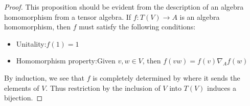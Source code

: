 \documentclass[../thesis.tex]{subfiles}
\begin{document}
            \begin{proof}
                This proposition should be evident from the description of an algebra homomorphism from a tensor algebra. If $f: T(V) \rightarrow A$ is an algebra homomorphism, then $f$ must satisfy the following conditions:
                \begin{itemize}
                    \item Unitality:\quad $f(1) = 1$
                    \item Homomorphism property:\quad Given $v,w\in V$, then $f(vw) = f(v)\nabla_Af(w)$
                \end{itemize}
                By induction, we see that $f$ is completely determined by where it sends the elements of $V$. Thus restriction by the inclusion of $V$ into $T(V)$ induces a bijection.
            \end{proof}
\end{document}
